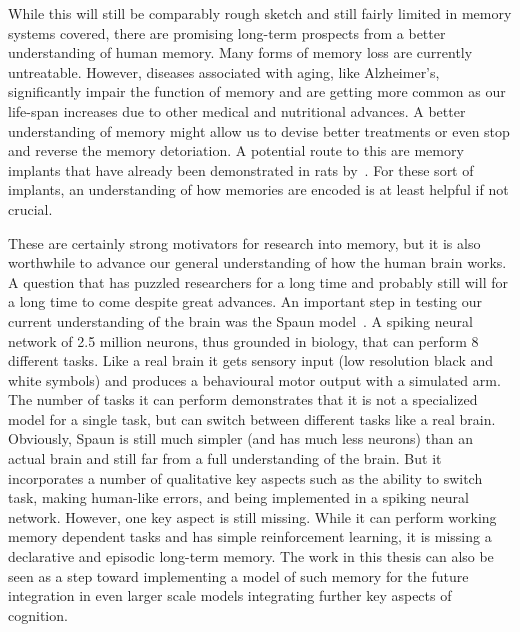 While this will still be comparably rough sketch and still fairly limited in memory systems covered, there are promising long-term prospects from a better understanding of human memory.
Many forms of memory loss are currently untreatable.
However, diseases associated with aging, like Alzheimer's, significantly impair the function of memory and are getting more common as our life-span increases due to other medical and nutritional advances.
A better understanding of memory might allow us to devise better treatments or even stop and reverse the memory detoriation.
A potential route to this are memory implants that have already been demonstrated in rats by~\textcite{Berger2011}.
For these sort of implants, an understanding of how memories are encoded is at least helpful if not crucial.

These are certainly strong motivators for research into memory, but it is also worthwhile to advance our general understanding of how the human brain works.
A question that has puzzled researchers for a long time and probably still will for a long time to come despite great advances.
An important step in testing our current understanding of the brain was the Spaun model~\parencite{Eliasmith2012}.
A spiking neural network of 2.5 million neurons, thus grounded in biology, that can perform 8 different tasks.
Like a real brain it gets sensory input (low resolution black and white symbols) and produces a behavioural motor output with a simulated arm.
The number of tasks it can perform demonstrates that it is not a specialized model for a single task, but can switch between different tasks like a real brain.
Obviously, Spaun is still much simpler (and has much less neurons) than an actual brain and still far from a full understanding of the brain.
But it incorporates a number of qualitative key aspects such as the ability to switch task, making human-like errors, and being implemented in a spiking neural network.
However, one key aspect is still missing.
While it can perform working memory dependent tasks and has simple reinforcement learning, it is missing a declarative and episodic long-term memory.
The work in this thesis can also be seen as a step toward implementing a model of such memory for the future integration in even larger scale models integrating further key aspects of cognition.


